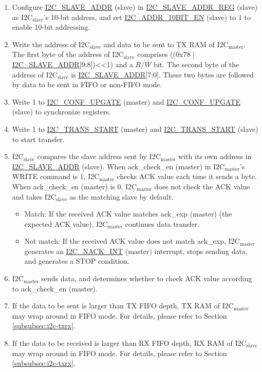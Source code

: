 \documentclass[main\_\_EN.tex]{subfiles}
\begin{document}
\begin{enumerate}
\item Configure \hyperref[fielddesc:I2CSLAVEADDR]{I2C\_SLAVE\_ADDR} (slave) in \hyperref[regdesc:I2CSLAVEADDRREG]{I2C\_SLAVE\_ADDR\_REG} (slave) as I2C$_\text{slave}$'s 10-bit address, and set \hyperref[fielddesc:I2CADDR10BITEN]{I2C\_ADDR\_10BIT\_EN} (slave) to 1 to enable 10-bit addressing.
\item Write the address of I2C$_\text{slave}$ and data to be sent to TX RAM of I2C$_\text{master}$. The first byte of the address of I2C$_\text{slave}$ comprises ((0x78 | \hyperref[fielddesc:I2CSLAVEADDR]{I2C\_SLAVE\_ADDR}[9:8])<<1) and a $R/\overline W$ bit. The second byte of the address of I2C$_\text{slave}$ is \hyperref[fielddesc:I2CSLAVEADDR]{I2C\_SLAVE\_ADDR}[7:0]. These two bytes are followed by data to be sent in FIFO or non-FIFO mode.
\item Write 1 to \hyperref[fielddesc:I2CCONFUPGATE]{I2C\_CONF\_UPGATE} (master) and \hyperref[fielddesc:I2CCONFUPGATE]{I2C\_CONF\_UPGATE} (slave) to synchronize registers.
\item Write 1 to \hyperref[fielddesc:I2CTRANSSTART]{I2C\_TRANS\_START} (master) and \hyperref[fielddesc:I2CTRANSSTART]{I2C\_TRANS\_START} (slave) to start transfer.
\item I2C$_\text{slave}$ compares the slave address sent by I2C$_\text{master}$ with its own address in \hyperref[fielddesc:I2CSLAVEADDR]{I2C\_SLAVE\_ADDR} (slave). When ack\_check\_en (master) in I2C$_\text{master}$'s WRITE command is 1, I2C$_\text{master}$ checks ACK value each time it sends a byte. When ack\_check\_en (master) is 0, I2C$_\text{master}$ does not check the ACK value and takes I2C$_\text{slave}$ as the matching slave by default.
\begin{itemize}
\item Match: If the received ACK value matches ack\_exp (master) (the expected ACK value), I2C$_\text{master}$ continues data transfer.
\item Not match: If the received ACK value does not match ack\_exp, I2C$_\text{master}$ generates an \hyperref[int:i2c-nack]{I2C\_NACK\_INT} (master) interrupt, stops sending data, and generates a STOP condition.
\end{itemize}


\item I2C$_\text{master}$ sends data, and determines whether to check ACK value according to ack\_check\_en (master).

\item If the data to be sent is larger than TX FIFO depth, TX RAM of I2C$_\text{master}$ may wrap around in FIFO mode. For details, please refer to Section \ref{subsubsec:i2c-txrx}. 
\item If the data to be received is larger than RX FIFO depth, RX RAM of I2C$_\text{slave}$ may wrap around in FIFO mode. For details, please refer to Section \ref{subsubsec:i2c-txrx}. 


\end{enumerate}
\end{document}
